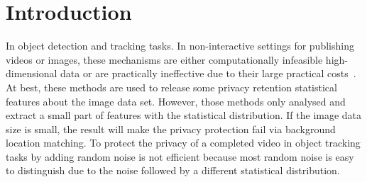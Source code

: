 \documentclass[journal,transmag]{IEEEtran}
\begin{document}
\maketitle


\IEEEdisplaynontitleabstractindextext







%



\section{Introduction}
%
%
%
%

In object detection and tracking tasks. In non-interactive settings for publishing videos or images, these mechanisms are either computationally infeasible high-dimensional data or are practically ineffective due to their large practical costs~\cite{mironov2017renyi}. At best, these methods are used to release some privacy retention statistical features about the image data set. However, those methods only analysed and extract a small part of features with the statistical distribution. If the image data size is small, the result will make the privacy protection fail via background location matching. To protect the privacy of a completed video in object tracking tasks by adding random noise is not efficient because most random noise is easy to distinguish due to the noise followed by a different statistical distribution.
\end{document}
